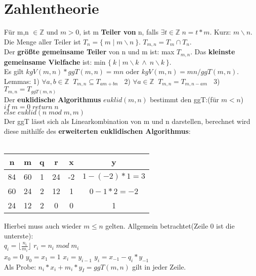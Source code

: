 \documentclass[11pt]{article}
\begin{document}
\section{Zahlentheorie}
F{\"u}r m,n $\in \mathbb{Z}$ und $m > 0$, ist m {\bfseries Teiler von} n, falls $\exists t\in \mathbb{Z} \; n=t*m$. Kurz: $m\backslash n$.\\
Die Menge aller Teiler ist $T_n = \{\: m \; |\;  m\backslash n \: \}$. $T_{m,n} = T_m \cap T_n$.\\
Der {\bfseries gr{\"o}{\ss}te gemeinsame Teiler} von n und m ist: max $T_{m,n}$. Das {\bfseries kleinste gemeinsame Vielfache} ist: min $\{\: k \; |\; m\backslash k \: \land \: n \backslash k \: \}$.\\
Es gilt $kgV(m,n) * ggT(m,n) = mn$ oder $kgV(m,n) = mn / ggT(m,n)$.\\
Lemmas: 1) $\forall a,b \in \mathbb{Z} \; \; T_{m,n} \subseteq T_{am+bn}\;\;$ 2) $\forall a \in \mathbb{Z} \; \; T_{m,n} = T_{m,n-am}\; \;$ 3) $T_{m,n} = T_{ggT(m,n)}$\\
Der {\bfseries euklidische Algorithmus} $euklid(m,n)$ bestimmt den ggT:(f{\"u}r $m<n$)\\
$if\; m = 0\; return\; n$\\ $else\; euklid(n\; mod\; m, m)$\\
Der ggT l{\"a}sst sich als Linearkombination von m und n darstellen, berechnet wird diese mithilfe des {\bfseries erweiterten euklidischen Algorithmus}:\\ \\
 \begin{tabular}{|c|c|c|c| |c|c|}\hline
  n  & m  & q & r  & x  & y \\ \hline
  84 & 60 & 1 & 24 & -2 & $1 - (-2)*1 = 3$ \\ \hline
  60 & 24 & 2 & 12 & 1  & $0-1*2=-2$ \\ \hline
  24 & 12 & 2 & 0  & 0  & 1 \\ \hline
 \end{tabular}
Hierbei muss auch wieder $m \leq n$ gelten.
Allgemein betrachtet(Zeile 0 ist die unterste):\\ $q_i = \lfloor \frac{n_i}{m_i} \rfloor$ \hspace{5mm} $r_i = n_i\; mod\; m_i$\\
$x_0 = 0$ $y_0 = x_1 = 1$ \hspace{5mm} $x_i = y_{i-1}$ \hspace{5mm} $y_i=x_{-1}-q_i*y_{-1}$ \\ Als Probe: $n_i*x_i+m_i*y_I = ggT(m,n)$ gilt in jeder Zeile.
\end{document}
